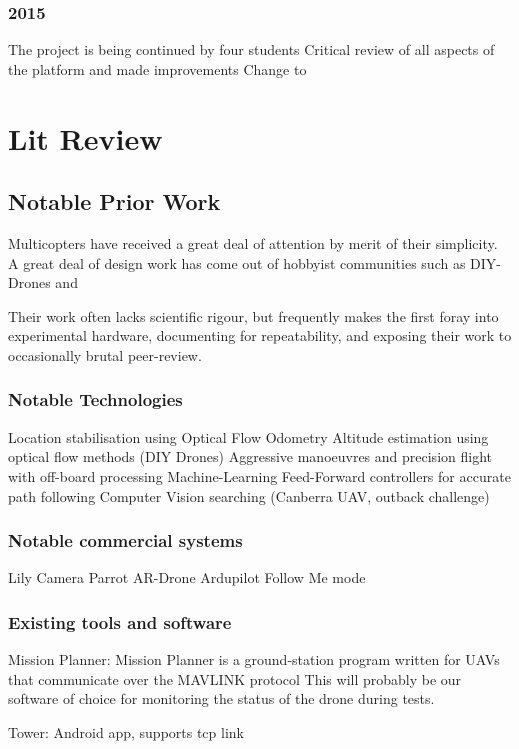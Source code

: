\documentclass[a4paper, 11pt, titlepage]{article}
\begin{document}
    \subsubsection{2015}
    The project is being continued by four students 
    Critical review of all aspects of the platform and made improvements
    Change to 

  \section{Lit Review}
  \subsection{Notable Prior Work}
    Multicopters have received a great deal of attention by merit of their simplicity. A great deal of design work has come out of hobbyist communities such as DIY-Drones and
    
    Their work often lacks scientific rigour, but frequently makes the first foray into experimental hardware, documenting for repeatability, and exposing their work to occasionally brutal peer-review.

    \subsubsection{Notable Technologies}
    Location stabilisation using Optical Flow Odometry
    Altitude estimation using optical flow methods (DIY Drones)
    Aggressive manoeuvres and precision flight with off-board processing
    Machine-Learning Feed-Forward controllers for accurate path following
    Computer Vision searching (Canberra UAV, outback challenge)


    \subsubsection{Notable commercial systems}
    Lily Camera
    Parrot AR-Drone
    Ardupilot Follow Me mode

    \subsubsection{Existing tools and software}
    Mission Planner:
      Mission Planner is a ground-station program written for UAVs that communicate over the MAVLINK protocol
      This will probably be our software of choice for monitoring the status of the drone during tests.

    Tower:
      Android app, supports tcp link
\end{document}
